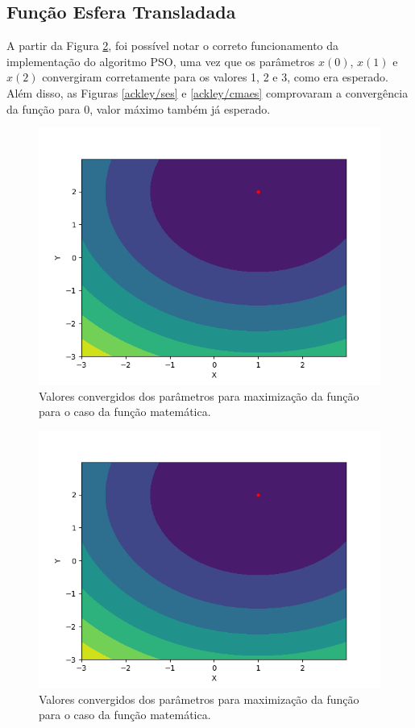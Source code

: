 \documentclass[conference]{IEEEtran}
\begin{document}
\subsection{Função Esfera Transladada}

A partir da Figura \ref{translated_sphere/cmaes}, foi possível notar o correto funcionamento da implementação do algoritmo PSO, uma vez que os parâmetros $x(0)$, $x(1)$ e $x(2)$ convergiram corretamente para os valores 1, 2 e 3, como era esperado. Além disso, as Figuras \ref{ackley/ses} e \ref{ackley/cmaes} comprovaram a convergência da função para $0$, valor máximo também já esperado.

\begin{figure}[htbp]
\centering
\centerline{\includegraphics[scale=0.4]{imagens/translated_sphere/ses.png}}
\caption{Valores convergidos dos parâmetros para maximização da função para o caso da função matemática.}
\label{translated_sphere/ses}
\end{figure}

\begin{figure}[htbp]
\centering
\centerline{\includegraphics[scale=0.4]{imagens/translated_sphere/cmaes.png}}
\caption{Valores convergidos dos parâmetros para maximização da função para o caso da função matemática.}
\label{translated_sphere/cmaes}
\end{figure}
\end{document}

